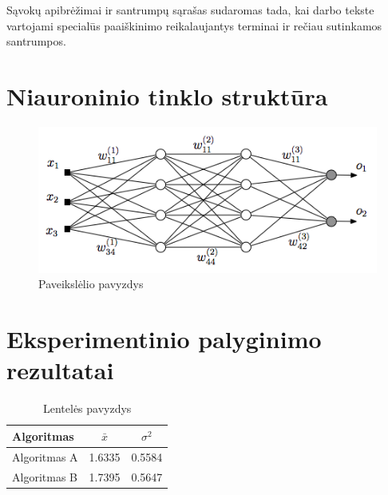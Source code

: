 \documentclass{VUMIFPSbakalaurinis}
\begin{document}
    Sąvokų apibrėžimai ir santrumpų sąrašas sudaromas tada, kai darbo tekste
    vartojami specialūs paaiškinimo reikalaujantys terminai ir rečiau sutinkamos
    santrumpos.
    
    \appendix  %
    
    \section{Niauroninio tinklo struktūra}
    \begin{figure}[H]
        \centering
        \includegraphics[scale=0.5]{img/MLP}
        \caption{Paveikslėlio pavyzdys}
        \label{img:mlp}
    \end{figure}
    
    
    \section{Eksperimentinio palyginimo rezultatai}
    \begin{table}[H]\footnotesize
      \centering
      \caption{Lentelės pavyzdys}
      {\begin{tabular}{|l|c|c|} \hline
        Algoritmas & $\bar{x}$ & $\sigma^{2}$ \\
        \hline
        Algoritmas A  & 1.6335    & 0.5584       \\
        Algoritmas B  & 1.7395    & 0.5647       \\
        \hline
      \end{tabular}}
      \label{tab:table example}
    \end{table}
    
    
\end{document}
